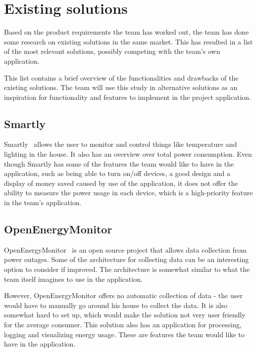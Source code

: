 \section{Existing solutions}
\label{sec:altsolution}
Based on the product requirements the team has worked out, the team has done some research on existing solutions in the same market. This has resulted in a list of the most relevant solutions, possibly competing with the team's own application.
 
This list contains a brief overview of the functionalities and drawbacks of the existing solutions. The team will use this study in alternative solutions as an inspiration for functionality and features to implement in the project application.

\subsection{Smartly}

Smartly~\cite{smartly} allows the user to monitor and control things like temperature and lighting in the house. It also has an overview over total power consumption. Even though Smartly has some of the features the team would like to have in the application, such as being able to turn on/off devices, a good design and a display of money saved caused by use of the application, it does not offer the ability to measure the power usage in each device, which is a high-priority feature in the team's application.

\subsection{OpenEnergyMonitor}

OpenEnergyMonitor~\cite{openenergymonitor} is an open source project that allows data collection from power outages. Some of the architecture for collecting data can be an interesting option to consider if improved. The architecture is somewhat similar to what the team itself imagines to use in the application. 

However, OpenEnergyMonitor offers no automatic collection of data - the user would have to manually go around his house to collect the data. It is also somewhat hard to set up, which would make the solution not very user friendly for the average consumer. This solution also has an application for processing, logging and visualizing energy usage. These are features the team would like to have in the application.


